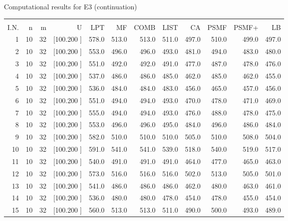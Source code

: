 \documentclass[12pt,a4paper]{article}
\begin{document}
\newpage
\begin{center}
 Computational results for E3 (continuation) {\tiny
\begin{tabular}{r r r r r r r r r r r r}\hline
    &   &   &          &        &        &        &        &        &        &        &       \\[-0.1in]
  I.N.  &  n  &  m  &  U  &  LPT  &  MF  &  COMB  &  LIST  &  CA  & PSMF &PSMF+ & LB \\[0.03in]
\hline
   1& 10& 32&[100.200   ]&   578.0&   513.0&   513.0&   511.0&   497.0&   510.0&   499.0&   497.0\\[-0.02in]
   2& 10& 32&[100.200   ]&   553.0&   496.0&   496.0&   493.0&   481.0&   494.0&   483.0&   480.0\\[-0.02in]
   3& 10& 32&[100.200   ]&   551.0&   492.0&   492.0&   491.0&   477.0&   487.0&   478.0&   476.0\\[-0.02in]
   4& 10& 32&[100.200   ]&   537.0&   486.0&   486.0&   485.0&   462.0&   485.0&   462.0&   455.0\\[-0.02in]
   5& 10& 32&[100.200   ]&   536.0&   484.0&   484.0&   483.0&   456.0&   465.0&   457.0&   456.0\\[-0.02in]
   6& 10& 32&[100.200   ]&   551.0&   494.0&   494.0&   493.0&   470.0&   478.0&   471.0&   469.0\\[-0.02in]
   7& 10& 32&[100.200   ]&   555.0&   494.0&   494.0&   493.0&   476.0&   488.0&   478.0&   475.0\\[-0.02in]
   8& 10& 32&[100.200   ]&   553.0&   496.0&   496.0&   495.0&   484.0&   496.0&   486.0&   484.0\\[-0.02in]
   9& 10& 32&[100.200   ]&   582.0&   510.0&   510.0&   510.0&   505.0&   510.0&   508.0&   504.0\\[-0.02in]
  10& 10& 32&[100.200   ]&   591.0&   541.0&   541.0&   539.0&   518.0&   540.0&   519.0&   517.0\\[-0.02in]
  11& 10& 32&[100.200   ]&   540.0&   491.0&   491.0&   491.0&   464.0&   477.0&   465.0&   463.0\\[-0.02in]
  12& 10& 32&[100.200   ]&   573.0&   516.0&   516.0&   516.0&   502.0&   513.0&   505.0&   501.0\\[-0.02in]
  13& 10& 32&[100.200   ]&   541.0&   486.0&   486.0&   486.0&   462.0&   480.0&   463.0&   461.0\\[-0.02in]
  14& 10& 32&[100.200   ]&   536.0&   480.0&   480.0&   478.0&   454.0&   478.0&   455.0&   454.0\\[-0.02in]
  15& 10& 32&[100.200   ]&   560.0&   513.0&   513.0&   511.0&   490.0&   500.0&   493.0&   489.0\\[-0.02in]

\end{tabular}}
\end{center}
\end{document}
